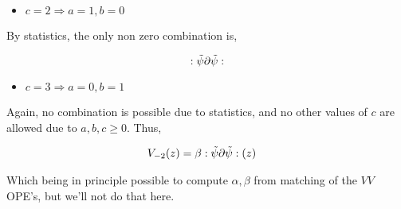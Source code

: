 \begin{itemize}
    \item $c=2\Rightarrow a=1,b=0$
\end{itemize}

By statistics, the only non zero combination is,

$$:\tilde\psi\partial\tilde\psi:$$

\begin{itemize}
    \item $c=3\Rightarrow a=0,b=1$
\end{itemize}

Again, no combination is possible due to statistics, and no other values of $c$ are allowed due to $a,b,c\geq0$. Thus,

\begin{align*}
    V_{-2}\qty(z)&=\beta:\tilde\psi\partial\tilde\psi:\qty(z)
\end{align*}

Which being in principle possible to compute $\alpha,\beta$ from matching of the $VV$ OPE's, but we'll not do that here.